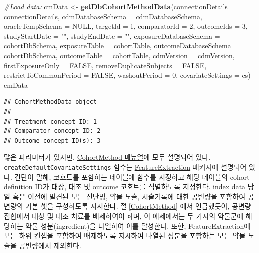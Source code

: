 \documentclass[11pt]{book}
\newenvironment{Shaded}{\begin{snugshade}}{\end{snugshade}}
\newcommand{\KeywordTok}[1]{\textcolor[rgb]{0.13,0.29,0.53}{\textbf{#1}}}
\newcommand{\DataTypeTok}[1]{\textcolor[rgb]{0.13,0.29,0.53}{#1}}
\newcommand{\DecValTok}[1]{\textcolor[rgb]{0.00,0.00,0.81}{#1}}
\newcommand{\StringTok}[1]{\textcolor[rgb]{0.31,0.60,0.02}{#1}}
\newcommand{\CommentTok}[1]{\textcolor[rgb]{0.56,0.35,0.01}{\textit{#1}}}
\newcommand{\OtherTok}[1]{\textcolor[rgb]{0.56,0.35,0.01}{#1}}
\newcommand{\NormalTok}[1]{#1}
\theoremstyle{definition}
\theoremstyle{definition}
\theoremstyle{definition}
\theoremstyle{remark}
\begin{document}
\begin{Shaded}
\begin{Highlighting}[]
\CommentTok{#Load data:}
\NormalTok{cmData <-}\StringTok{ }\KeywordTok{getDbCohortMethodData}\NormalTok{(}\DataTypeTok{connectionDetails =}\NormalTok{ connectionDetails,}
                                \DataTypeTok{cdmDatabaseSchema =}\NormalTok{ cdmDatabaseSchema,}
                                \DataTypeTok{oracleTempSchema =} \OtherTok{NULL}\NormalTok{,}
                                \DataTypeTok{targetId =} \DecValTok{1}\NormalTok{,}
                                \DataTypeTok{comparatorId =} \DecValTok{2}\NormalTok{,}
                                \DataTypeTok{outcomeIds =} \DecValTok{3}\NormalTok{,}
                                \DataTypeTok{studyStartDate =} \StringTok{""}\NormalTok{,}
                                \DataTypeTok{studyEndDate =} \StringTok{""}\NormalTok{,}
                                \DataTypeTok{exposureDatabaseSchema =}\NormalTok{ cohortDbSchema,}
                                \DataTypeTok{exposureTable =}\NormalTok{ cohortTable,}
                                \DataTypeTok{outcomeDatabaseSchema =}\NormalTok{ cohortDbSchema,}
                                \DataTypeTok{outcomeTable =}\NormalTok{ cohortTable,}
                                \DataTypeTok{cdmVersion =}\NormalTok{ cdmVersion,}
                                \DataTypeTok{firstExposureOnly =} \OtherTok{FALSE}\NormalTok{,}
                                \DataTypeTok{removeDuplicateSubjects =} \OtherTok{FALSE}\NormalTok{,}
                                \DataTypeTok{restrictToCommonPeriod =} \OtherTok{FALSE}\NormalTok{,}
                                \DataTypeTok{washoutPeriod =} \DecValTok{0}\NormalTok{,}
                                \DataTypeTok{covariateSettings =}\NormalTok{ cs)}
\NormalTok{cmData}
\end{Highlighting}
\end{Shaded}

\begin{verbatim}
## CohortMethodData object
## 
## Treatment concept ID: 1
## Comparator concept ID: 2
## Outcome concept ID(s): 3
\end{verbatim}

많은 파라미터가 있지만,
\href{https://ohdsi.github.io/CohortMethod/reference/}{CohortMethod
매뉴얼}에 모두 설명되어 있다. \texttt{createDefaultCovariateSettings}
함수는
\href{https://ohdsi.github.io/FeatureExtraction/}{FeatureExtraction}
패키지에 설명되어 있다. 간단이 말해, 코호트를 포함하는 테이블에 함수를
지정하고 해당 테이블의 cohort definition ID가 대상, 대조 및 outcome
코호트를 식별하도록 지정한다. index data 당일 혹은 이전에 발견된 모든
진단명, 약물 노출, 시술기록에 대한 공변량을 포함하여 공변량의 기본 셋을
구성하도록 지시한다. 절 \ref{CohortMethod} 에서 언급했듯이, 공변량
집합에서 대상 및 대조 치료를 배제하여야 하며, 이 예제에서는 두 가지의
약물군에 해당하는 약물 성분(ingredient)을 나열하여 이를 달성한다. 또한,
FeatureExtraction에 모든 하위 컨셉을 포함하여 배제하도록 지시하여 나열된
성분을 포함하는 모든 약물 노출을 공변량에서 제외한다.
\end{document}
